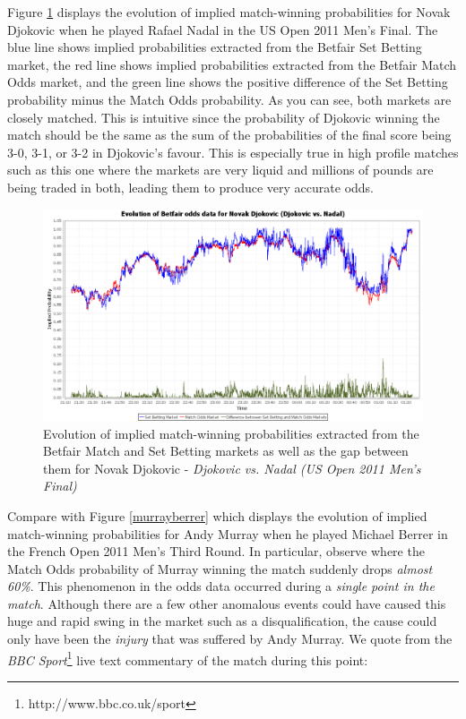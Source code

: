 \documentclass[letterpaper,12pt]{article}
\begin{document}
Figure \ref{djokovicnadal} displays the evolution of implied match-winning probabilities for Novak Djokovic when he played Rafael Nadal in the US Open 2011 Men's Final.  The blue line shows implied probabilities extracted from the Betfair Set Betting market, the red line shows implied probabilities extracted from the Betfair Match Odds market, and the green line shows the positive difference of the Set Betting probability minus the Match Odds probability.  As you can see, both markets are closely matched.  This is intuitive since the probability of Djokovic winning the match should be the same as the sum of the probabilities of the final score being 3-0, 3-1, or 3-2 in Djokovic's favour.  This is especially true in high profile matches such as this one where the markets are very liquid and millions of pounds are being traded in both, leading them to produce very accurate odds.

\begin{figure}[H]
\includegraphics[width=12.5cm]{matches/djokovicnadal}
\centering
\caption{Evolution of implied match-winning probabilities extracted from the Betfair Match and Set Betting markets as well as the gap between them for Novak Djokovic - \textit{Djokovic vs. Nadal (US Open 2011 Men's Final)}}
\label{djokovicnadal}
\end{figure}

Compare with Figure \ref{murrayberrer} which displays the evolution of implied match-winning probabilities for Andy Murray when he played Michael Berrer in the French Open 2011 Men's Third Round.  In particular, observe where the Match Odds probability of Murray winning the match suddenly drops \textit{almost 60\%}.  This phenomenon in the odds data occurred during a \textit{single point in the match}.  Although there are a few other anomalous events could have caused this huge and rapid swing in the market such as a disqualification, the cause could only have been the \textit{injury} that was suffered by Andy Murray.  We quote from the \textit{BBC Sport}\footnote{http://www.bbc.co.uk/sport} live text commentary of the match during this point:
\end{document}
